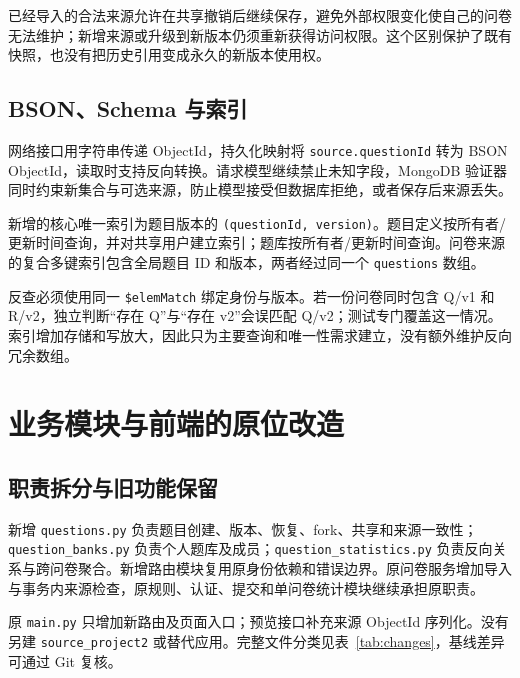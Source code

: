 \documentclass[UTF8,10pt,a4paper,twocolumn,fontset=none]{ctexart}
\begin{document}
已经导入的合法来源允许在共享撤销后继续保存，避免外部权限变化使自己的问卷无法维护；新增来源或升级到新版本仍须重新获得访问权限。这个区别保护了既有快照，也没有把历史引用变成永久的新版本使用权。

\subsection{BSON、Schema 与索引}
网络接口用字符串传递 ObjectId，持久化映射将 \texttt{source.questionId} 转为 BSON ObjectId，读取时支持反向转换。请求模型继续禁止未知字段，MongoDB 验证器同时约束新集合与可选来源，防止模型接受但数据库拒绝，或者保存后来源丢失。

新增的核心唯一索引为题目版本的 \texttt{(questionId, version)}。题目定义按所有者/更新时间查询，并对共享用户建立索引；题库按所有者/更新时间查询。问卷来源的复合多键索引包含全局题目 ID 和版本，两者经过同一个 \texttt{questions} 数组。

反查必须使用同一 \texttt{\$elemMatch} 绑定身份与版本。若一份问卷同时包含 Q/v1 和 R/v2，独立判断“存在 Q”与“存在 v2”会误匹配 Q/v2；测试专门覆盖这一情况。索引增加存储和写放大，因此只为主要查询和唯一性需求建立，没有额外维护反向冗余数组。

\section{业务模块与前端的原位改造}
\subsection{职责拆分与旧功能保留}
新增 \texttt{questions.py} 负责题目创建、版本、恢复、fork、共享和来源一致性；\texttt{question\_banks.py} 负责个人题库及成员；\texttt{question\_statistics.py} 负责反向关系与跨问卷聚合。新增路由模块复用原身份依赖和错误边界。原问卷服务增加导入与事务内来源检查，原规则、认证、提交和单问卷统计模块继续承担原职责。

原 \texttt{main.py} 只增加新路由及页面入口；预览接口补充来源 ObjectId 序列化。没有另建 \texttt{source\_project2} 或替代应用。完整文件分类见表~\ref{tab:changes}，基线差异可通过 Git 复核。
\end{document}

